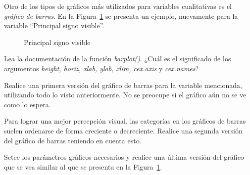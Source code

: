 \documentclass{prob}
\begin{document}
	\begin{problema}
	Otro de los tipos de gráficos más utilizados para variables cualitativas es el \textit{gráfico de barras}. En la Figura~\ref{fig:plot02} se presenta un ejemplo, nuevamente para la variable \textquotedblleft Principal signo visible\textquotedblright.\\
	
\begin{figure}[!ht]
    \centering
    
    \caption{Principal signo visible}
    \label{fig:plot02}
\end{figure}	
	
	\begin{parte}
		Lea la documentación de la función \textit{barplot()}. ¿Cuál es el significado de los argumentos \textit{height, horiz, xlab, ylab, xlim, cex.axis} y \textit{cex.names}?
	\end{parte}	
	
	\begin{parte}
	Realice una primera versión del gráfico de barras para la variable mencionada, utilizando todo lo visto anteriormente. No se preocupe si el gráfico aún no se ve como lo espera.	
	\end{parte}
	
	\begin{parte}
	Para lograr una mejor percepción visual, las categorías en los gráficos de barras suelen ordenarse de forma creciente o decreciente. Realice una segunda versión del gráfico de barras teniendo en cuenta esto. \\
	
	\noindent{}	
	\end{parte}
	
	\begin{parte}
	Setee los parámetros gráficos necesarios y realice una última versión del gráfico que se vea similar al que se presenta en la Figura~\ref{fig:plot02}.
	\end{parte}	
	\end{problema}
	
\end{document}
